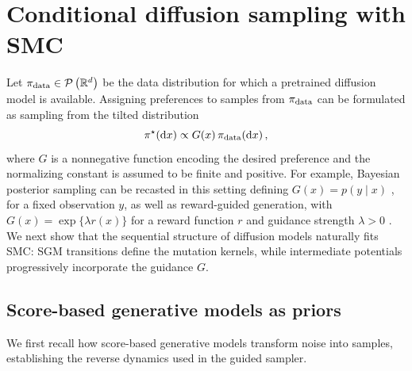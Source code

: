 \documentclass[11pt]{article}
\theoremstyle{plain}
\theoremstyle{definition}
\theoremstyle{remark}
\begin{document}
\section{Conditional diffusion sampling with SMC}
\label{sec:diffusion_smc}

Let $\pi_{\mathrm{data}}\in\mathcal{P} \left(\mathbb{R}^d\right)$ be the data distribution for which a pretrained diffusion model is available. Assigning preferences to samples from $\pi_{\mathrm{data}}$ can be formulated as sampling from the tilted distribution
$$
\pi^\star(\mathrm{d}x) \propto G(x)\,\pi_{\mathrm{data}}(\mathrm{d}x)\,,
$$
where $G$ is a nonnegative function encoding the desired preference and the normalizing constant is assumed to be finite and positive. For example, Bayesian posterior sampling can be recasted in this setting defining $G(x)=p(y\mid x)$ \citep{wu2023practical,cardoso2024monte}, for a fixed observation $y$, as well as reward-guided generation, with $G(x)=\exp\{\lambda r(x)\}$ for a reward function $r$ and guidance strength $\lambda>0$ \citep{wu2023human,black2024training, fan2023dpok, marion2025implicit}. We next show that the sequential structure of diffusion models naturally fits SMC: SGM transitions define the mutation kernels, while intermediate potentials progressively incorporate the guidance $G$. 




\subsection{Score-based generative models as priors}

We first recall how score-based generative models transform noise into samples, establishing the reverse dynamics used in the guided sampler.
\end{document}
